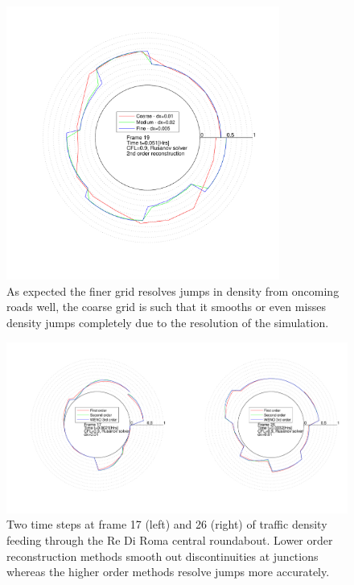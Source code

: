 	\begin{figure}
    		\centering
        		\includegraphics[trim=60 60 40 40,clip,width=0.8\textwidth]{ReDiRoma_grid.pdf}
		\caption[Re Di Roma : Grid resolution]{As expected the finer grid resolves jumps in density from oncoming roads well, the coarse grid is such that it smooths or even misses density jumps completely due to the resolution of the simulation.}
		\label{fig:randd:rediroma:grids}
	\end{figure}
	
	\begin{figure}
    		\centering
        		\includegraphics[trim=60 55 20 40,clip,width=\textwidth]{ReDiRoma_reco.pdf}
		\caption[Re Di Roma : Reconstruction]{Two time steps at frame 17 (left) and 26 (right) of traffic density feeding through the Re Di Roma central roundabout. Lower order reconstruction methods smooth out discontinuities at junctions whereas the higher order methods resolve jumps more accurately.}
		\label{fig:randd:rediroma:reco}
	\end{figure}
	
